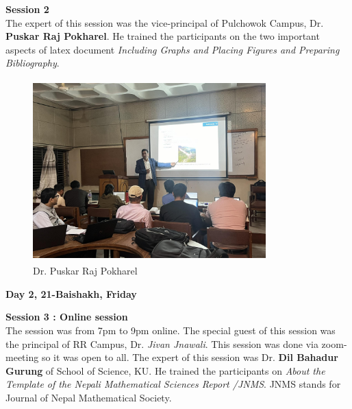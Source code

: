 \message{ !name(latexworkhop_report.tex)}\documentclass[a4paper,12pt]{report}
\begin{document}
\vspace{5mm}

{\bfseries \large Session 2}\\[3mm]
The expert of this session was the vice-principal of Pulchowok Campus, Dr. \textbf{Puskar Raj Pokharel}. He trained the participants on the two important aspects of latex document \textit{Including Graphs and Placing Figures and Preparing Bibliography}.
\vspace{3mm}

\begin{figure}[h!]
  \centering
  \includegraphics[height=7cm, width=9cm]{puskar.jpg}
  \caption{Dr. Puskar Raj Pokharel}
\end{figure}
\clearpage

\begin{center}
  {\bfseries \Large Day 2, 21-Baishakh, Friday}
\end{center}
\vspace{3mm}

{\bfseries \large Session 3 : Online session}\\[3mm]
The session was from 7pm to 9pm online. The special guest of this session was the principal of RR Campus, Dr. \textit{Jivan Jnawali}.  This session was done via zoom-meeting so it was open to all. The expert of this session was Dr. \textbf{Dil Bahadur Gurung} of School of Science, KU. He trained the participants on \textit{About the Template of the Nepali Mathematical Sciences Report /JNMS}. JNMS stands for Journal of Nepal Mathematical Society.
\end{document}
